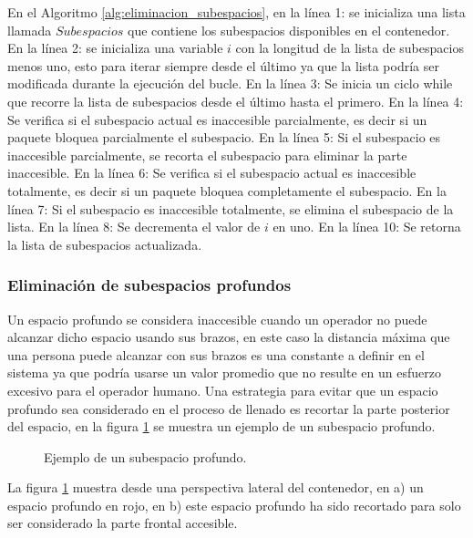 \documentclass[openany]{article}
\begin{document}
En el Algoritmo \ref{alg:eliminacion_subespacios}, en la línea 1: se inicializa una lista llamada $Subespacios$ que contiene los subespacios disponibles en el contenedor. En la línea 2: se inicializa una variable $i$ con la longitud de la lista de subespacios menos uno, esto para iterar siempre desde el último ya que la lista podría ser modificada durante la ejecución del bucle. En la línea 3: Se inicia un ciclo while que recorre la lista de subespacios desde el último hasta el primero. En la línea 4: Se verifica si el subespacio actual es inaccesible parcialmente, es decir si un paquete bloquea parcialmente el subespacio. En la línea 5: Si el subespacio es inaccesible parcialmente, se recorta el subespacio para eliminar la parte inaccesible. En la línea 6: Se verifica si el subespacio actual es inaccesible totalmente, es decir si un paquete bloquea completamente el subespacio. En la línea 7: Si el subespacio es inaccesible totalmente, se elimina el subespacio de la lista. En la línea 8: Se decrementa el valor de $i$ en uno. En la línea 10: Se retorna la lista de subespacios actualizada.

\subsubsection{Eliminación de subespacios profundos}

Un espacio profundo se considera inaccesible cuando un operador no puede alcanzar dicho espacio usando sus brazos, en este caso la distancia máxima que una persona puede alcanzar con sus brazos es una constante a definir en el sistema ya que podría usarse un valor promedio que no resulte en un esfuerzo excesivo para el operador humano. Una estrategia para evitar que un espacio profundo sea considerado en el proceso de llenado es recortar la parte posterior del espacio, en la figura \ref{fig:subespacio_profundo} se muestra un ejemplo de un subespacio profundo.

\begin{figure}[H]
    \centering
    
    \caption{Ejemplo de un subespacio profundo.}
    \label{fig:subespacio_profundo}
\end{figure}

La figura \ref{fig:subespacio_profundo} muestra desde una perspectiva lateral del contenedor, en a) un espacio profundo en rojo, en b) este espacio profundo ha sido recortado para solo ser considerado la parte frontal accesible.
\end{document}
